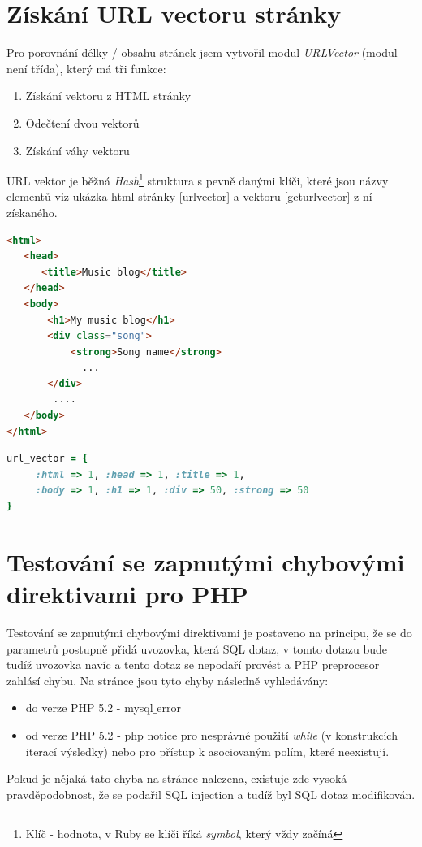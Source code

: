 \section{Získání URL vectoru stránky}
Pro porovnání délky / obsahu stránek jsem vytvořil modul \textit{URLVector} (modul není třída), který má tři funkce:
\begin{enumerate}
\item Získání vektoru z HTML stránky
\item Odečtení dvou vektorů
\item Získání váhy vektoru
\end{enumerate}
URL vektor je běžná \textit{Hash}\footnote{Klíč - hodnota, v Ruby se klíči říká \textit{symbol}, který vždy začíná \uv{:}} struktura s pevně danými klíči, které jsou názvy elementů viz ukázka html stránky \ref{urlvector} a vektoru \ref{geturlvector} z ní získaného.
\begin{lstlisting}[label=urlvector,language=HTML, caption=HTML stránka]
<html>
   <head>
      <title>Music blog</title>
   </head>
   <body>
       <h1>My music blog</h1>
       <div class="song">
           <strong>Song name</strong>
             ...
       </div>
        ....
   </body>
</html>
\end{lstlisting}

\begin{lstlisting}[label=geturlvector,language=Ruby, caption=Získaný URL vektor]
url_vector = {
     :html => 1, :head => 1, :title => 1, 
     :body => 1, :h1 => 1, :div => 50, :strong => 50
}
\end{lstlisting}


\section{Testování se zapnutými chybovými direktivami pro PHP}
Testování se zapnutými chybovými direktivami je postaveno na principu, že se do parametrů postupně přidá uvozovka, která  SQL dotaz, v tomto dotazu bude tudíž uvozovka navíc a tento dotaz se nepodaří provést a PHP preprocesor zahlásí chybu. Na stránce jsou tyto chyby následně vyhledávány:
\begin{itemize}
\item do verze PHP 5.2 - mysql$\_$error
\item od verze PHP 5.2 - php notice pro nesprávné použití \textit{while} (v konstrukcích iterací výsledky) nebo pro přístup k asociovaným polím, které neexistují.
\end{itemize}
Pokud je nějaká tato chyba na stránce nalezena, existuje zde vysoká pravděpodobnost, že se podařil SQL injection a tudíž byl SQL dotaz modifikován.

